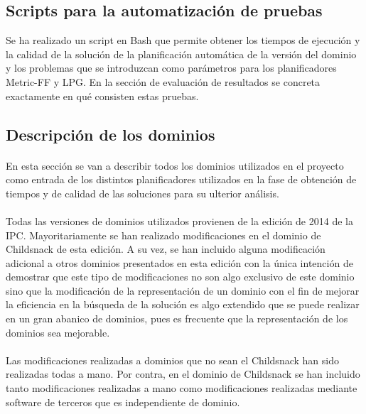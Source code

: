 \documentclass{article}
\begin{document}
\subsection{Scripts para la automatización de pruebas}
Se ha realizado un script en Bash que permite obtener los tiempos de ejecución y la calidad de la solución de la planificación automática de la versión del dominio y los problemas que se introduzcan como parámetros para los planificadores Metric-FF y LPG. En la sección de evaluación de resultados se concreta exactamente en qué consisten estas pruebas.

\subsection{Descripción de los dominios}

\paragraph{}

En esta sección se van a describir todos los dominios utilizados en el proyecto
como entrada de los distintos planificadores utilizados en la fase de obtención
de tiempos y de calidad de las soluciones para su ulterior análisis. 

\paragraph{}
Todas las versiones de dominios utilizados provienen de la edición de 2014 de la IPC. Mayoritariamente se han realizado modificaciones en el dominio de Childsnack de esta edición. A su vez, se han incluido alguna modificación adicional a otros dominios presentados en esta edición con la única intención de demostrar que este tipo de modificaciones no son algo exclusivo de este dominio sino que la modificación de la representación de un dominio con el fin de mejorar la eficiencia en la búsqueda de la solución es algo extendido que se puede realizar en un gran abanico de dominios, pues es frecuente que la representación de los dominios sea mejorable.

\paragraph{}
Las modificaciones realizadas a dominios que no sean el Childsnack han sido realizadas todas a mano. Por contra, en el dominio de Childsnack se han incluido tanto modificaciones realizadas a mano como modificaciones realizadas mediante software de terceros que es independiente de dominio.
\end{document}
